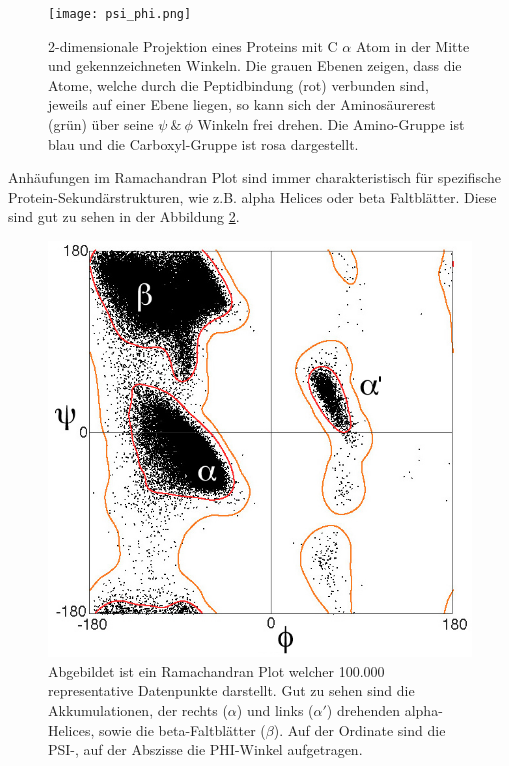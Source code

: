 \begin{figure}
    \centering
    \texttt{[image: psi\_phi.png]}
    \caption{2-dimensionale Projektion eines Proteins mit C $\alpha$ Atom in der Mitte und gekennzeichneten Winkeln. Die grauen Ebenen zeigen, dass die Atome, welche durch die Peptidbindung (rot) verbunden sind, jeweils auf einer Ebene liegen, so kann sich der Aminosäurerest (grün) über seine $\psi\ \&\ \phi$ Winkeln frei drehen. Die Amino-Gruppe ist blau und die Carboxyl-Gruppe ist rosa dargestellt.\protect\footnotemark}
    \label{fig:psi_phi}
\end{figure}

Anhäufungen im Ramachandran Plot sind immer charakteristisch für spezifische Protein-Sekundärstrukturen, wie z.B. alpha Helices oder beta Faltblätter. Diese sind gut zu sehen in der Abbildung \ref{fig:ramaplot}.

\begin{figure}[H]
    \centering
    \includegraphics[width=.80\textwidth]{images/Ramaplot.png}
    \caption{Abgebildet ist ein Ramachandran Plot welcher 100.000 representative Datenpunkte darstellt. Gut zu sehen sind die Akkumulationen, der rechts ($\alpha$) und links ($\alpha'$) drehenden alpha-Helices, sowie die beta-Faltblätter ($\beta$). Auf der Ordinate sind die PSI-, auf der Abszisse die PHI-Winkel aufgetragen\protect\footnotemark.}
    \label{fig:ramaplot}
\end{figure}

